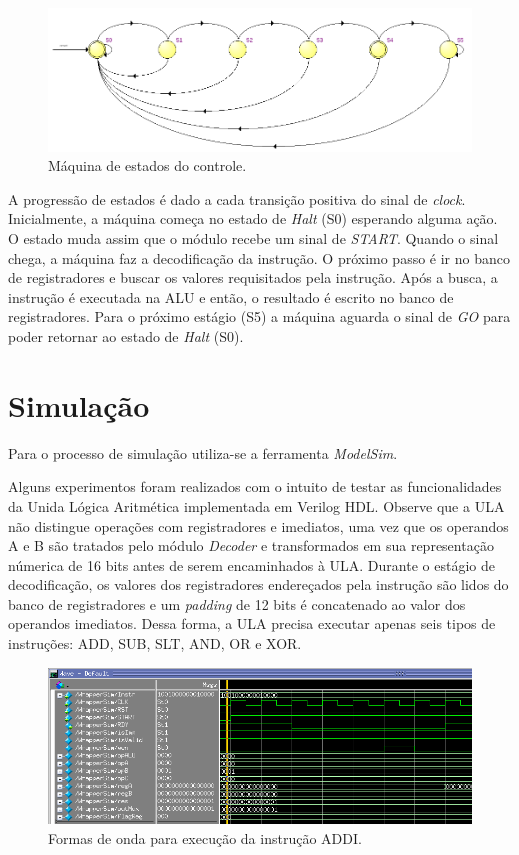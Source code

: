 \documentclass[11pt,a4paper,titlepage]{article}
\begin{document}
\begin{figure}[h]
\centering
\includegraphics[scale=0.4]{images/StateMachine.png}
\caption{Máquina de estados do controle.}
\label{fig:statemachine}
\end{figure}

A progressão de estados é dado a cada transição positiva do sinal de \textit{clock}. Inicialmente, a máquina começa no estado de \textit{Halt} (S0) esperando alguma ação. O estado muda assim que o módulo recebe um sinal de \textit{START}. Quando o sinal chega, a máquina faz a decodificação da instrução. O próximo passo é ir no banco de registradores e buscar os valores requisitados pela instrução. Após a busca, a instrução é executada na ALU e então, o resultado é escrito no banco de registradores. Para o próximo estágio (S5) a máquina aguarda o sinal de \textit{GO} para poder retornar ao estado de \textit{Halt} (S0).


\section{Simulação}

Para o processo de simulação utiliza-se a ferramenta \textit{ModelSim}.

Alguns experimentos foram realizados com o intuito de testar as funcionalidades da Unida Lógica Aritmética implementada em Verilog HDL. Observe que a ULA não distingue operações com registradores e imediatos, uma vez que os operandos A e B são tratados pelo módulo \textit{Decoder} e transformados em sua representação númerica de 16 bits antes de serem encaminhados à ULA. Durante o estágio de decodificação, os valores dos registradores endereçados pela instrução são lidos do banco de registradores e um \textit{padding} de 12 bits é concatenado ao valor dos operandos imediatos. Dessa forma, a ULA precisa executar apenas seis tipos de instruções: ADD, SUB, SLT, AND, OR e XOR.

\begin{figure}[t]
\centering
\includegraphics[scale=0.5]{images/ADDI_Sim.png}
\caption{Formas de onda para execução da instrução ADDI.}
\label{fig:modelsim}
\end{figure}
\end{document}
